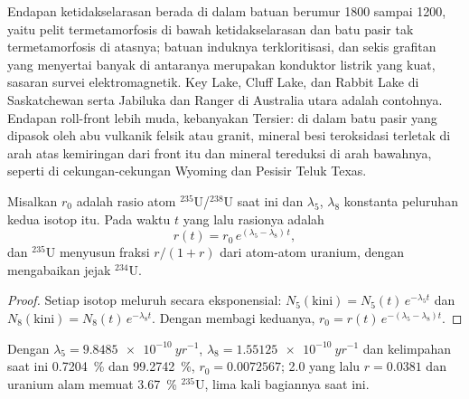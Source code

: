 Endapan ketidakselarasan berada di dalam batuan berumur 1800 sampai \qty{1200}{\Ma}, yaitu pelit
termetamorfosis di bawah ketidakselarasan dan batu pasir tak termetamorfosis di atasnya; batuan induknya terkloritisasi, dan sekis grafitan yang
menyertai banyak di antaranya merupakan konduktor listrik yang kuat, sasaran survei elektromagnetik. Key
Lake, Cluff Lake, dan Rabbit Lake di Saskatchewan serta Jabiluka dan Ranger di Australia utara adalah
contohnya. Endapan roll-front lebih muda, kebanyakan Tersier: di dalam batu pasir yang dipasok oleh abu vulkanik felsik atau
granit, mineral besi teroksidasi terletak di arah atas kemiringan dari front itu dan mineral tereduksi di arah bawahnya, seperti di cekungan-cekungan
Wyoming dan Pesisir Teluk Texas.

\begin{proposition}\label{prop:b2:energy-geology:u235}
Misalkan $r_0$ adalah rasio atom $^{235}$U/$^{238}$U saat ini dan $\lambda_5$, $\lambda_8$ konstanta peluruhan
kedua isotop itu. Pada waktu $t$ yang lalu rasionya adalah
\begin{equation}
r(t) = r_0\,e^{(\lambda_5 - \lambda_8)\,t} ,
\label{eq:b2:energy-geology:u235}
\end{equation}
dan $^{235}$U menyusun fraksi $r/(1 + r)$ dari atom-atom uranium, dengan mengabaikan jejak
$^{234}$U.
\end{proposition}

\begin{proof}
Setiap isotop meluruh secara eksponensial: $N_5(\text{kini}) = N_5(t)\,e^{-\lambda_5 t}$ dan $N_8(\text{kini})
= N_8(t)\,e^{-\lambda_8 t}$. Dengan membagi keduanya, $r_0 = r(t)\,e^{-(\lambda_5 - \lambda_8)t}$.
\end{proof}

Dengan $\lambda_5 = \qty{9.8485e-10}{yr^{-1}}$, $\lambda_8 = \qty{1.55125e-10}{yr^{-1}}$ dan kelimpahan
saat ini \qty{0.7204}{\percent} dan \qty{99.2742}{\percent}, $r_0 = 0.0072567$; \qty{2.0}{\Ga}
yang lalu $r = 0.0381$ dan uranium alam memuat \qty{3.67}{\percent} $^{235}$U, lima kali bagiannya
saat ini.

